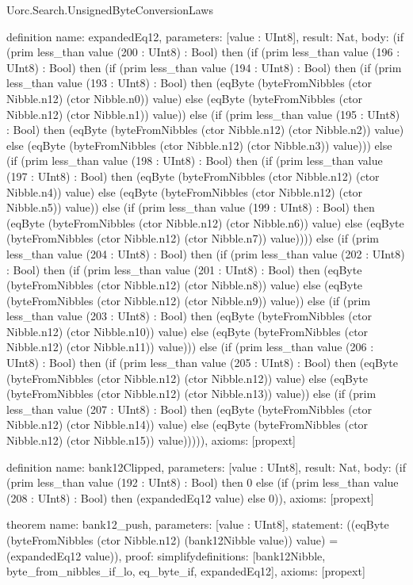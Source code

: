 \begin{lexlean}{Uorc.Search.UnsignedByteConversionLaws}
\begin{semanticmodule}
definition{
  name: expandedEq12,
  parameters: [value : UInt8],
  result: Nat,
  body: (if (prim less_than value (200 : UInt8) : Bool) then (if (prim less_than value (196 : UInt8) : Bool) then (if (prim less_than value (194 : UInt8) : Bool) then (if (prim less_than value (193 : UInt8) : Bool) then (eqByte (byteFromNibbles (ctor Nibble.n12) (ctor Nibble.n0)) value) else (eqByte (byteFromNibbles (ctor Nibble.n12) (ctor Nibble.n1)) value)) else (if (prim less_than value (195 : UInt8) : Bool) then (eqByte (byteFromNibbles (ctor Nibble.n12) (ctor Nibble.n2)) value) else (eqByte (byteFromNibbles (ctor Nibble.n12) (ctor Nibble.n3)) value))) else (if (prim less_than value (198 : UInt8) : Bool) then (if (prim less_than value (197 : UInt8) : Bool) then (eqByte (byteFromNibbles (ctor Nibble.n12) (ctor Nibble.n4)) value) else (eqByte (byteFromNibbles (ctor Nibble.n12) (ctor Nibble.n5)) value)) else (if (prim less_than value (199 : UInt8) : Bool) then (eqByte (byteFromNibbles (ctor Nibble.n12) (ctor Nibble.n6)) value) else (eqByte (byteFromNibbles (ctor Nibble.n12) (ctor Nibble.n7)) value)))) else (if (prim less_than value (204 : UInt8) : Bool) then (if (prim less_than value (202 : UInt8) : Bool) then (if (prim less_than value (201 : UInt8) : Bool) then (eqByte (byteFromNibbles (ctor Nibble.n12) (ctor Nibble.n8)) value) else (eqByte (byteFromNibbles (ctor Nibble.n12) (ctor Nibble.n9)) value)) else (if (prim less_than value (203 : UInt8) : Bool) then (eqByte (byteFromNibbles (ctor Nibble.n12) (ctor Nibble.n10)) value) else (eqByte (byteFromNibbles (ctor Nibble.n12) (ctor Nibble.n11)) value))) else (if (prim less_than value (206 : UInt8) : Bool) then (if (prim less_than value (205 : UInt8) : Bool) then (eqByte (byteFromNibbles (ctor Nibble.n12) (ctor Nibble.n12)) value) else (eqByte (byteFromNibbles (ctor Nibble.n12) (ctor Nibble.n13)) value)) else (if (prim less_than value (207 : UInt8) : Bool) then (eqByte (byteFromNibbles (ctor Nibble.n12) (ctor Nibble.n14)) value) else (eqByte (byteFromNibbles (ctor Nibble.n12) (ctor Nibble.n15)) value))))),
  axioms: [propext]
}

definition{
  name: bank12Clipped,
  parameters: [value : UInt8],
  result: Nat,
  body: (if (prim less_than value (192 : UInt8) : Bool) then 0 else (if (prim less_than value (208 : UInt8) : Bool) then (expandedEq12 value) else 0)),
  axioms: [propext]
}

theorem{
  name: bank12_push,
  parameters: [value : UInt8],
  statement: ((eqByte (byteFromNibbles (ctor Nibble.n12) (bank12Nibble value)) value) = (expandedEq12 value)),
  proof: simplify{definitions: [bank12Nibble, byte_from_nibbles_if_lo, eq_byte_if, expandedEq12]},
  axioms: [propext]
}


\end{semanticmodule}
\end{lexlean}
